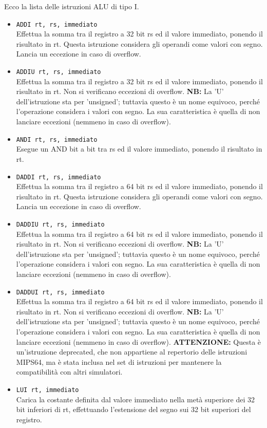 \documentclass[12pt]{report}
\newcommand{\MS}{MIPS64}
\newcommand{\WARN}{\textbf{ATTENZIONE:} Questa \`{e} un'istruzione deprecated, che
non appartiene al repertorio delle istruzioni \MS{}, ma \`{e} stata inclusa nel set di
istruzioni per mantenere la compatibilit\`{a} con altri simulatori.}
\newcommand{\MISN}{\textbf{NB:} La 'U' dell'istruzione sta per 'unsigned'; tuttavia questo \`{e} 
un nome equivoco, perch\'{e} l'operazione considera i valori con segno. La sua caratteristica \`{e} 
quella di non lanciare eccezioni (nemmeno in caso di overflow).}
\begin{document}
Ecco la lista delle istruzioni ALU di tipo I.

\begin{itemize}
	\item \texttt{ADDI rt, rs, immediato}\\
	Effettua la somma tra il registro a 32 bit rs ed il valore immediato, ponendo il risultato in rt. 
	Questa istruzione considera gli operandi come valori con segno.
	Lancia un eccezione in caso di overflow.

	\item \texttt{ADDIU rt, rs, immediato}\\
	Effettua la somma tra il registro a 32 bit rs ed il valore immediato, ponendo il risultato in rt. 
	Non si verificano eccezioni di overflow.
	\MISN{}
	
	\item \texttt{ANDI rt, rs, immediato}\\
	Esegue un AND bit a bit tra rs ed il valore immediato, ponendo il risultato in rt.

	\item \texttt{DADDI rt, rs, immediato}\\
	Effettua la somma tra il registro a 64 bit rs ed il valore immediato, ponendo il risultato in rt. 
	Questa istruzione considera gli operandi come valori con segno.
	Lancia un eccezione in caso di overflow.

	\item \texttt{DADDIU rt, rs, immediato}\\
	Effettua la somma tra il registro a 64 bit rs ed il valore immediato, ponendo il risultato in rt. 
	Non si verificano eccezioni di overflow.
	\MISN{}

	\item \texttt{DADDUI rt, rs, immediato}\\
	Effettua la somma tra il registro a 64 bit rs ed il valore immediato, ponendo il risultato in rt. 
	Non si verificano eccezioni di overflow.
	\MISN{}
    \WARN{}

	\item \texttt{LUI rt, immediato}\\
	Carica la costante definita dal valore immediato nella met\`{a} superiore dei 32
	bit inferiori di rt, effettuando l'estensione del segno sui 32 bit superiori del registro. 


\end{itemize}
\end{document}
